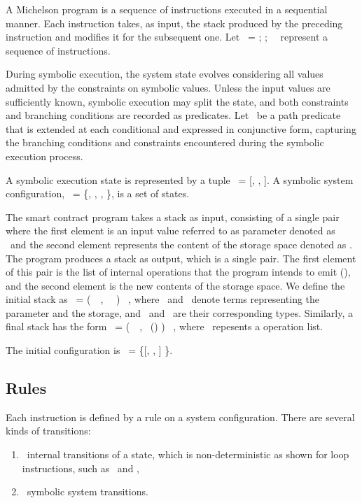 \documentclass[a4paper,USenglish,cleveref, autoref,anonymous]{lipics-v2021}
\begin{document}
A Michelson program is a sequence of instructions executed in a
sequential manner. Each instruction takes, as input, the stack
produced by the preceding instruction and modifies it for the
subsequent one. Let \INSTRUCTION\ = \InstructionOne; \InstructionTwo;
\DOT\  \InstructionN\ represent a sequence of instructions.

During symbolic execution,  the system state evolves considering all
values admitted by the constraints on symbolic values. Unless the
input values are sufficiently known, symbolic execution may split the
state, and both constraints and branching conditions are recorded as
predicates. Let \PREDICATE\ be a path predicate that is extended at
each conditional and expressed in conjunctive form, capturing the
branching conditions and constraints encountered during the symbolic
execution process. 
\begin{definition}
A symbolic execution state is represented by a tuple \STATE\ =
[\INSTRUCTION, \STACK, \PREDICATE].
A symbolic system configuration, \SYSTEM\ = \{\STATEONE, \STATETWO,
\DOT, \STATEN \}, is a set of  states.
\end{definition}

The smart contract program takes a stack as input, consisting of a
single pair where the first element is an input value referred to as
parameter denoted as \VPAR\ and the second element represents the
content of the storage space denoted as \VSTORAGE. The program
produces a stack as output, which is a single pair. The first element
of this pair is the list of internal operations that the program
intends to emit (\VOPERATIONLIST), and the second element is the new
contents of the storage space.  We define the initial stack as
\SINIT\   = (\KPAIR\ \VPAR\ \VSTORAGE, \TPAIR\ \TYF\ \TYS)
\STACKCONCAT\ \EMPTYSTACK, where \VPAR\ and \VSTORAGE\ denote terms
representing the parameter and the storage, and \TYF\ and \TYS\ are
their corresponding types. Similarly, a final stack has the form
\SFINAL\   = (\PAIR\ \VOPERATIONLIST\ \VSTORAGE, \TPAIR\
(\TOPERATIONLIST) \TYS) \STACKCONCAT\ \EMPTYSTACK, where
\VOPERATIONLIST\ repesents a operation list.

The initial configuration is \SYSTEMINIT\ = \{[\INSTRUCTION, \SINIT, \TRUE] \}. 

\subsection{Rules}
Each instruction is defined by a rule on a system configuration. There
are several kinds of transitions:
\begin{enumerate}
\item \StateTrans\ internal transitions of a state, which is
  non-deterministic  as shown for loop instructions, such as \LOOP\
  and \LOOPLEFT, 
\item \SystemTrans\ symbolic system transitions.
\end{enumerate}
\end{document}
